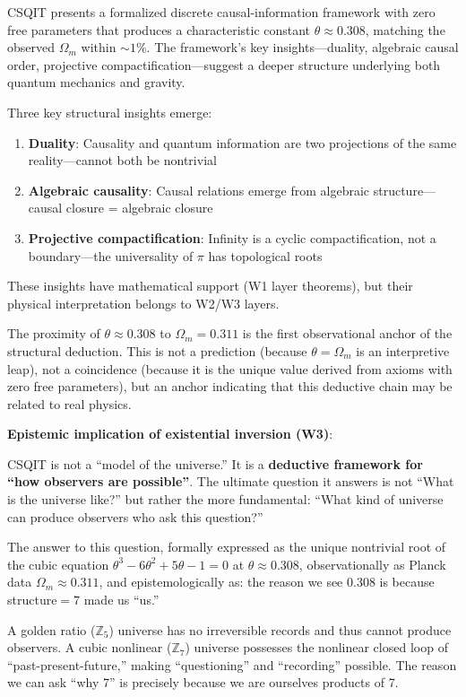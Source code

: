 \documentclass[aps,prd,twocolumn,nofootinbib,floatfix]{revtex4-2}
\begin{document}
CSQIT presents a formalized discrete causal-information framework with zero free parameters that produces a characteristic constant $\theta \approx 0.308$, matching the observed $\Omega_m$ within $\sim 1\%$. The framework's key insights---duality, algebraic causal order, projective compactification---suggest a deeper structure underlying both quantum mechanics and gravity.

Three key structural insights emerge:
\begin{enumerate}
    \item \textbf{Duality}: Causality and quantum information are two projections of the same reality---cannot both be nontrivial
    \item \textbf{Algebraic causality}: Causal relations emerge from algebraic structure---causal closure = algebraic closure
    \item \textbf{Projective compactification}: Infinity is a cyclic compactification, not a boundary---the universality of $\pi$ has topological roots
\end{enumerate}

These insights have mathematical support (W1 layer theorems), but their physical interpretation belongs to W2/W3 layers.

The proximity of $\theta \approx 0.308$ to $\Omega_m = 0.311$ is the first observational anchor of the structural deduction. This is not a prediction (because $\theta = \Omega_m$ is an interpretive leap), not a coincidence (because it is the unique value derived from axioms with zero free parameters), but an anchor indicating that this deductive chain may be related to real physics.

\textbf{Epistemic implication of existential inversion (W3)}:

CSQIT is not a ``model of the universe.'' It is a \textbf{deductive framework for ``how observers are possible''}. The ultimate question it answers is not ``What is the universe like?'' but rather the more fundamental: ``What kind of universe can produce observers who ask this question?''

The answer to this question, formally expressed as the unique nontrivial root of the cubic equation $\theta^3 - 6\theta^2 + 5\theta - 1 = 0$ at $\theta \approx 0.308$, observationally as Planck data $\Omega_m \approx 0.311$, and epistemologically as: the reason we see 0.308 is because structure$=7$ made us ``us.''

A golden ratio ($\mathbb{Z}_5$) universe has no irreversible records and thus cannot produce observers. A cubic nonlinear ($\mathbb{Z}_7$) universe possesses the nonlinear closed loop of ``past-present-future,'' making ``questioning'' and ``recording'' possible. The reason we can ask ``why 7'' is precisely because we are ourselves products of 7.
\end{document}
